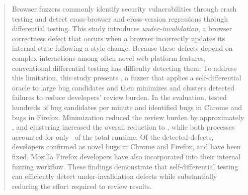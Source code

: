 
\begin{abstract}
  Browser fuzzers commonly identify security vulnerabilities through crash
  testing and detect cross-browser and cross-version regressions through
  differential testing. This study introduces \emph{under-invalidation}, a
  browser correctness defect that occurs when a browser incorrectly updates
  its internal state following a style change. Because these defects depend on
  complex interactions among often novel web platform features, conventional
  differential testing has difficulty detecting them. To address this
  limitation, this study presents \toolname, a fuzzer that applies a
  self-differential oracle to large bug candidates and then minimizes and
  clusters detected failures to reduce developers' review burden. In the
  evaluation, \toolname tested hundreds of bug candidates per minute and
  identified \NumBugsChromeWeights bugs in Chrome and \NumBugsFfxWeights bugs
  in Firefox. Minimization reduced the review burden by approximately
  \StyleElementOriginalToMinimizedFactor{}, and clustering increased the
  overall reduction to \StyleElementOriginalToClusteredFactor{}, while both
  processes accounted for only \RuntimePercentMinClust\ of the total runtime.
  Of the detected defects, developers confirmed \NumBugsNovel as novel bugs in
  Chrome and Firefox, and \NumBugsFixed have been fixed. Mozilla Firefox
  developers have also incorporated \toolname into their internal fuzzing
  workflow. These findings demonstrate that self-differential testing can
  efficiently detect under-invalidation defects while substantially reducing
  the effort required to review results.
\end{abstract}
